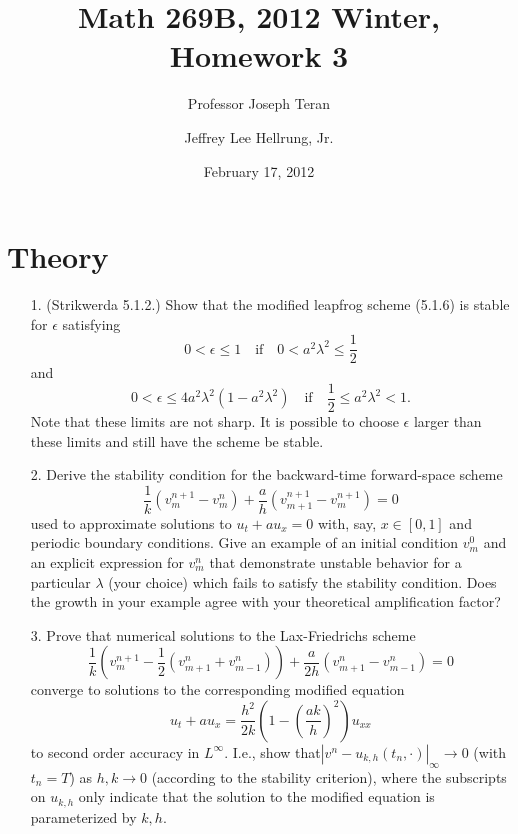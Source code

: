 \documentclass{article}
\providecommand{\abs}[1]{\left\lvert#1\right\rvert}
\begin{document}
\title{Math 269B, 2012 Winter, Homework 3}
\date{February 17, 2012}
\author{Professor Joseph Teran \and Jeffrey Lee Hellrung, Jr.}
\maketitle

\section{Theory}

\begin{itemize}

\item[1.] (Strikwerda 5.1.2.) Show that the modified leapfrog scheme (5.1.6) is stable for $\epsilon$ satisfying
\begin{equation*}
0 < \epsilon \leq 1 \quad \text{if} \quad 0 < a^2 \lambda^2 \leq \frac{1}{2}
\end{equation*}
and
\begin{equation*}
0 < \epsilon \leq 4 a^2 \lambda^2 \left( 1 - a^2 \lambda^2 \right) \quad \text{if} \quad \frac{1}{2} \leq a^2 \lambda^2 < 1.
\end{equation*}
Note that these limits are not sharp. It is possible to choose $\epsilon$ larger than these limits and still have the scheme be stable.

\item[2.] Derive the stability condition for the backward-time forward-space scheme
\begin{equation*}
\frac{1}{k} \left( v^{n+1}_m - v^n_m \right) + \frac{a}{h} \left( v^{n+1}_{m+1} - v^{n+1}_m \right) = 0
\end{equation*}
used to approximate solutions to $u_t + a u_x = 0$ with, say, $x \in [0,1]$ and periodic boundary conditions. Give an example of an initial condition $v^0_m$ and an explicit expression for $v^n_m$ that demonstrate unstable behavior for a particular $\lambda$ (your choice) which fails to satisfy the stability condition. Does the growth in your example agree with your theoretical amplification factor?

\item[3.] Prove that numerical solutions to the Lax-Friedrichs scheme
\begin{equation*}
\frac{1}{k} \left( v^{n+1}_m - \frac{1}{2} \left( v^n_{m+1} + v^n_{m-1} \right) \right) + \frac{a}{2h} \left( v^n_{m+1} - v^n_{m-1} \right) = 0
\end{equation*}
converge to solutions to the corresponding modified equation
\begin{equation*}
u_t + a u_x = \frac{h^2}{2k} \left( 1 - \left( \frac{a k}{h} \right)^2 \right) u_{xx}
\end{equation*}
to second order accuracy in $L^{\infty}$. I.e., show that$\abs{v^n - u_{k,h} \left( t_n, \cdot \right)}_{\infty} \to 0$ (with $t_n = T$) as $h,k \to 0$ (according to the stability criterion), where the subscripts on $u_{k,h}$ only indicate that the solution to the modified equation is parameterized by $k,h$.


\end{itemize}
\end{document}
